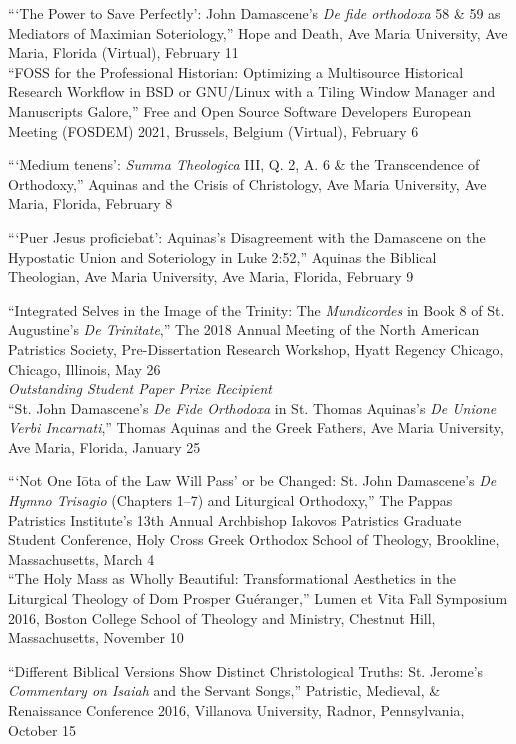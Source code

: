 \documentclass[letterpaper,12pt]{article}
\newcommand{\years}[1]{%
  {\reversemarginpar\strut\marginnote{{\small#1}}}%
}
\begin{document}
{{{{{{{%
```The Power to Save Perfectly': John Damascene's \emph{De fide orthodoxa} 58 \& 59 as Mediators of Maximian Soteriology,'' Hope and Death, Ave Maria University, Ave Maria, Florida (Virtual), February 11 \\ [.3cm]
%
``FOSS for the Professional Historian: Optimizing a Multisource Historical Research Workflow in BSD or GNU/Linux with a Tiling Window Manager and Manuscripts Galore,'' Free and Open Source Software Developers European Meeting (FOSDEM) 2021, Brussels, Belgium (Virtual), February 6 \\ [.3cm]
%
\years{2020}%
%
```Medium tenens': \emph{Summa Theologica} III, Q. 2, A. 6 \& the Transcendence of Orthodoxy,'' Aquinas and the Crisis of Christology, Ave Maria University, Ave Maria, Florida, February 8 \\ [.3cm]
%
\years{2019}%
%
```Puer Jesus proficiebat': Aquinas's Disagreement with the Damascene on the Hypostatic Union and Soteriology in Luke 2:52,'' Aquinas the Biblical Theologian, Ave Maria University, Ave Maria, Florida, February 9 \\ [.3cm]
%
\years{2018}%
%
``Integrated Selves in the Image of the Trinity: The \emph{Mundicordes} in Book 8 of St. Augustine's \emph{De Trinitate},'' The 2018 Annual Meeting of the North American Patristics Society, Pre-Dissertation Research Workshop, Hyatt Regency Chicago, Chicago, Illinois, May 26 \\
\hfill\emph{Outstanding Student Paper Prize Recipient} \\ [.3cm]
%
``St. John Damascene's \emph{De Fide Orthodoxa} in St. Thomas Aquinas's \emph{De Unione Verbi Incarnati},'' Thomas Aquinas and the Greek Fathers, Ave Maria University, Ave Maria, Florida, January 25 \\ [.3cm]
%
\years{2017}%
%
```Not One I\=ota of the Law Will Pass' or be Changed: St. John Damascene's \emph{De Hymno Trisagio} (Chapters 1–7) and Liturgical Orthodoxy,'' The Pappas Patristics Institute's 13th Annual Archbishop Iakovos Patristics Graduate Student Conference, Holy Cross Greek Orthodox School of Theology, Brookline, Massachusetts, March 4 \\ [.3cm]
%
``The Holy Mass as Wholly Beautiful: Transformational Aesthetics in the Liturgical Theology of Dom Prosper Guéranger,'' Lumen et Vita Fall Symposium 2016, Boston College School of Theology and Ministry, Chestnut Hill, Massachusetts, November 10 \\ [.3cm]
%
\years{2016}%
%
``Different Biblical Versions Show Distinct Christological Truths: St. Jerome's \emph{Commentary on Isaiah} and the Servant Songs,'' Patristic, Medieval, \& Renaissance Conference 2016, Villanova University, Radnor, Pennsylvania, October 15 \\ [.3cm]
}}}}}}}
\end{document}
